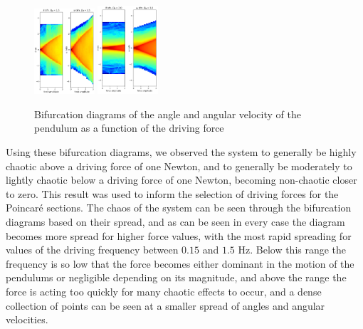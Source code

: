 \documentclass[11pt]{article} %
\begin{document}
\begin{figure}[H]
        \includegraphics[width=0.2\textwidth]{bfn_1.5.png}
        \includegraphics[width=0.2\textwidth]{bfn_3.0.png}
        \caption{Bifurcation diagrams of the angle and angular velocity of the pendulum as a function of the driving force}
        \label{fig:bifurcation}
    \end{figure}
    Using these bifurcation diagrams, we observed the system to generally be highly chaotic above a driving force of one Newton, and to generally
    be moderately to lightly chaotic below a driving force of one Newton, becoming non-chaotic closer to zero. This result was used to inform
    the selection of driving forces for the Poincar\'e sections. The chaos of the system can be seen through the bifurcation diagrams based on their
    spread, and as can be seen in every case the diagram becomes more spread for higher force values, with the most rapid spreading for values of the
    driving frequency between $0.15$ and $1.5$ Hz. Below this range the frequency is so low that the force becomes either dominant in the motion of the
    pendulums or negligible depending on its magnitude, and above the range the force is acting too quickly for many chaotic effects to occur, and a
    dense collection of points can be seen at a smaller spread of angles and angular velocities.\\
\end{document}
